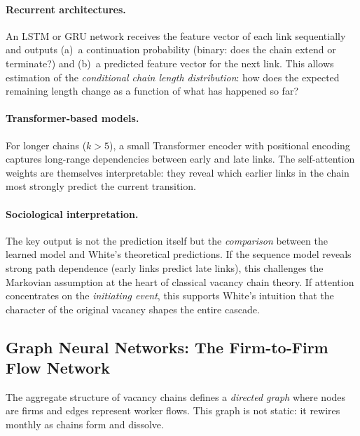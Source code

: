 \documentclass[a4paper]{tufte-handout}
\begin{document}
\paragraph{Recurrent architectures.}
An LSTM or GRU network receives the feature vector of each link sequentially and outputs (a)~a continuation probability (binary: does the chain extend or terminate?) and (b)~a predicted feature vector for the next link. This allows estimation of the \emph{conditional chain length distribution}: how does the expected remaining length change as a function of what has happened so far?

\paragraph{Transformer-based models.}
For longer chains ($k > 5$), a small Transformer encoder with positional encoding captures long-range dependencies between early and late links. The self-attention weights are themselves interpretable: they reveal which earlier links in the chain most strongly predict the current transition.

\paragraph{Sociological interpretation.}
The key output is not the prediction itself but the \emph{comparison} between the learned model and White's theoretical predictions. If the sequence model reveals strong path dependence (early links predict late links), this challenges the Markovian assumption at the heart of classical vacancy chain theory. If attention concentrates on the \emph{initiating event}, this supports White's intuition that the character of the original vacancy shapes the entire cascade.


\subsection{Graph Neural Networks: The Firm-to-Firm Flow Network}

The aggregate structure of vacancy chains defines a \emph{directed graph} where nodes are firms and edges represent worker flows. This graph is not static: it rewires monthly as chains form and dissolve.
\end{document}
